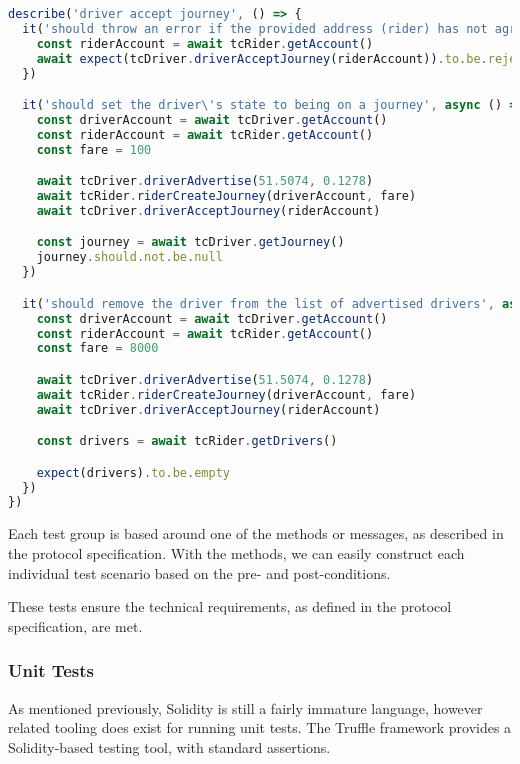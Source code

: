 \begin{lstlisting}[language=JavaScript]
describe('driver accept journey', () => {
  it('should throw an error if the provided address (rider) has not agreed to ride with the driver', async () => {
    const riderAccount = await tcRider.getAccount()
    await expect(tcDriver.driverAcceptJourney(riderAccount)).to.be.rejected
  })

  it('should set the driver\'s state to being on a journey', async () => {
    const driverAccount = await tcDriver.getAccount()
    const riderAccount = await tcRider.getAccount()
    const fare = 100

    await tcDriver.driverAdvertise(51.5074, 0.1278)
    await tcRider.riderCreateJourney(driverAccount, fare)
    await tcDriver.driverAcceptJourney(riderAccount)

    const journey = await tcDriver.getJourney()
    journey.should.not.be.null
  })

  it('should remove the driver from the list of advertised drivers', async () => {
    const driverAccount = await tcDriver.getAccount()
    const riderAccount = await tcRider.getAccount()
    const fare = 8000

    await tcDriver.driverAdvertise(51.5074, 0.1278)
    await tcRider.riderCreateJourney(driverAccount, fare)
    await tcDriver.driverAcceptJourney(riderAccount)

    const drivers = await tcRider.getDrivers()

    expect(drivers).to.be.empty
  })
})
\end{lstlisting}


Each test group is based around one of the methods or messages, as described in the protocol specification. With the methods, we can easily construct each individual test scenario based on the pre- and post-conditions.

These tests ensure the technical requirements, as defined in the protocol specification, are met.

\subsubsection{Unit Tests}


As mentioned previously, Solidity is still a fairly immature language, however related tooling does exist for running unit tests. The Truffle framework \cite{Truffle} provides a Solidity-based testing tool, with standard assertions.

